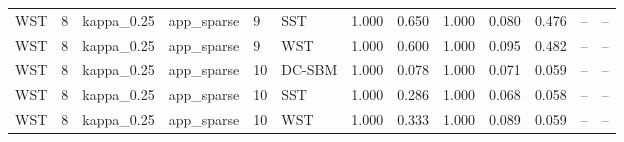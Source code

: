 \begin{table}[!h]
\begin{tabular}[t]{lllllllllllll}
WST & 8 & kappa_0.25 & app_sparse & 9 & SST & 1.000 & 0.650 & 1.000 & 0.080 & 0.476 & -- & --\\
WST & 8 & kappa_0.25 & app_sparse & 9 & WST & 1.000 & 0.600 & 1.000 & 0.095 & 0.482 & -- & --\\
WST & 8 & kappa_0.25 & app_sparse & 10 & DC-SBM & 1.000 & 0.078 & 1.000 & 0.071 & 0.059 & -- & --\\
WST & 8 & kappa_0.25 & app_sparse & 10 & SST & 1.000 & 0.286 & 1.000 & 0.068 & 0.058 & -- & --\\
WST & 8 & kappa_0.25 & app_sparse & 10 & WST & 1.000 & 0.333 & 1.000 & 0.089 & 0.059 & -- & --\\
\bottomrule
\end{tabular}
\end{table}

